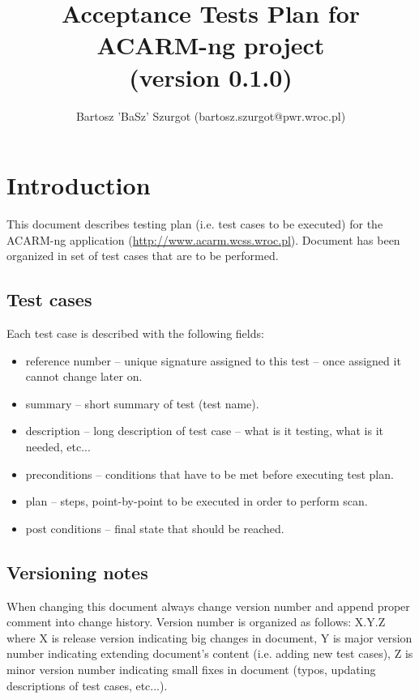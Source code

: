 \documentclass[a4paper,12pt]{article}
\title{Acceptance Tests Plan for ACARM-ng project\\(version 0.1.0)}
\author{Bartosz 'BaSz' Szurgot (bartosz.szurgot@pwr.wroc.pl)}
\begin{document}
%
%


%
%
\maketitle


\tableofcontents


\section{Introduction}

This document describes testing plan (i.e. test cases to be executed) for the ACARM-ng application
(\url{http://www.acarm.wcss.wroc.pl}). Document has been organized in set of test cases that are to be performed.



\subsection{Test cases}
Each test case is described with the following fields:
\begin{itemize}
  \item reference number -- unique signature assigned to this test -- once assigned it cannot change later on.
  \item summary -- short summary of test (test name).
  \item description -- long description of test case -- what is it testing, what is it needed, etc...
  \item preconditions -- conditions that have to be met before executing test plan.
  \item plan -- steps, point-by-point to be executed in order to perform scan.
  \item post conditions -- final state that should be reached.
\end{itemize}



\subsection{Versioning notes}
When changing this document always change version number and append proper comment into change history.
Version number is organized as follows: X.Y.Z where X is release version indicating big changes in document,
Y is major version number indicating extending document's content (i.e. adding new test cases), Z is minor
version number indicating small fixes in document (typos, updating descriptions of test cases, etc...).
\end{document}
